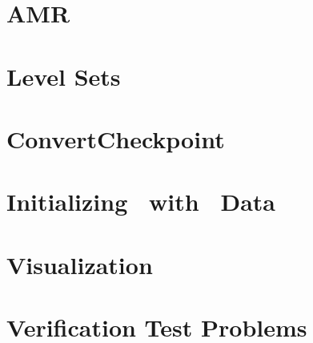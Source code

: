 \documentclass[11pt]{book}
\makeatletter
\renewcommand*\cleardoublepage{\clearpage\if@twoside
\ifodd\c@page\else
\hbox{}
\thispagestyle{empty}
\newpage
\if@twocolumn\hbox{}\newpage\fi\fi\fi}
\makeatother
\begin{document}
\chapter{AMR}


\chapter{Level Sets}\label{Chap:Level Sets}



\chapter{ConvertCheckpoint}


\chapter{Initializing \castro\ with \maestro\ Data}


\chapter{Visualization}


\chapter{Verification Test Problems}



\backmatter

\renewcommand\bibname{References}



\cleardoublepage
{}
{}
\printindex
\end{document}
